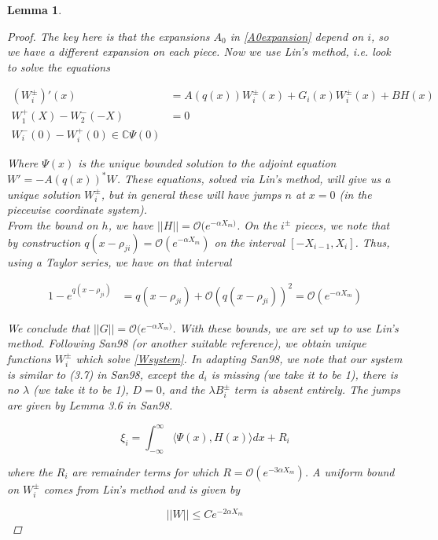 \documentclass[12pt]{article}
\def\C{{\mathbb C}}
\newtheorem{lemma}{Lemma}
\begin{document}
\begin{lemma}
\begin{proof}
The key here is that the expansions $A_0$ in \eqref{A0expansion} depend on $i$, so we have a different expansion on each piece. Now we use Lin's method, i.e. look to solve the equations

\begin{align}
(W_i^\pm)'(x) &= A(q(x)) W_i^\pm(x) + G_i(x) W_i^\pm(x)+ B H(x) \nonumber \\
W_1^+(X) - W_2^-(-X) &= 0 \label{Wsystem} \\
W_i^-(0) - W_i^+(0) \in \C \Psi(0) \nonumber 
\end{align}

Where $\Psi(x)$ is the unique bounded solution to the adjoint equation $W' = -A(q(x))^* W$. These equations, solved via Lin's method, will give us a unique solution $W_i^\pm$, but in general these will have jumps $n$ at $x = 0$ (in the piecewise coordinate system).\\

From the bound on $h$, we have $||H|| = \mathcal{O}(e^{-\alpha X_m)}$. On the $i^\pm$ pieces, we note that by construction $q(x - \rho_{ji}) = \mathcal{O}(e^{-\alpha X_m})$ on the interval $[-X_{i-1}, X_i]$. Thus, using a Taylor series, we have on that interval

\begin{align*}
1 - e^{q(x - \rho_{ji})} &= q(x - \rho_{ji}) + \mathcal{O}(q(x - \rho_{ji}))^2 = \mathcal{O}(e^{-\alpha X_m})
\end{align*}

We conclude that $||G|| = \mathcal{O}(e^{-\alpha X_m)}$. With these bounds, we are set up to use Lin's method. Following San98 (or another suitable reference), we obtain unique functions $W_i^\pm$ which solve \eqref{Wsystem}. In adapting San98, we note that our system is similar to (3.7) in San98, except the $d_i$ is missing (we take it to be 1), there is no $\lambda$ (we take it to be 1), $D = 0$, and the $\lambda B_i^\pm$ term is absent entirely. The jumps are given by Lemma 3.6 in San98.

\begin{equation}
\xi_i = \int_{-\infty}^\infty \langle \Psi(x), H(x) \rangle dx + R_i
\end{equation}

where the $R_i$ are remainder terms for which $R = \mathcal{O}(e^{-3 \alpha X_m})$. A uniform bound on $W_i^\pm$ comes from Lin's method and is given by 

\begin{equation}\label{Wbound}
||W|| \leq C e^{-2 \alpha X_m}
\end{equation}


\end{proof}
\end{lemma}
\end{document}
